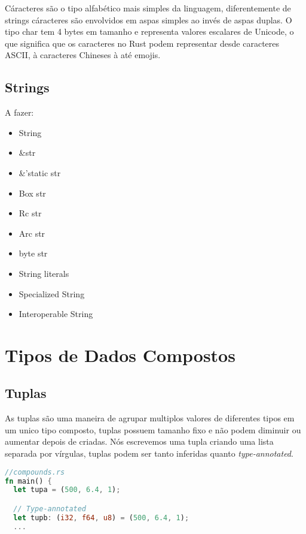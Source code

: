 Cáracteres são o tipo alfabético mais simples da linguagem, diferentemente de strings cáracteres são envolvidos em aspas simples ao invés de aspas duplas. O tipo char tem 4 bytes em tamanho e representa valores escalares de Unicode, o que significa que os caracteres no Rust podem representar desde caracteres ASCII, à caracteres Chineses à até emojis.

\subsection{Strings}

A fazer:
\begin{itemize}
  \item String
  \item \&str
  \item \&'static str
  \item Box str
  \item Rc str
  \item Arc str
  \item byte str
  \item String literals
  \item Specialized String
  \item Interoperable String
\end{itemize}

\section{Tipos de Dados Compostos}

\subsection{Tuplas}

As tuplas são uma maneira de agrupar multiplos valores de diferentes tipos em um unico tipo composto, tuplas possuem tamanho fixo e não podem diminuir ou aumentar depois de criadas. Nós escrevemos uma tupla criando uma lista separada por vírgulas, tuplas podem ser tanto inferidas quanto \textit{type-annotated}.
\pagebreak
\newpage
\begin{lstlisting}[language=rust]
//compounds.rs
fn main() {
  let tupa = (500, 6.4, 1);

  // Type-annotated
  let tupb: (i32, f64, u8) = (500, 6.4, 1);
  ...
\end{lstlisting}

